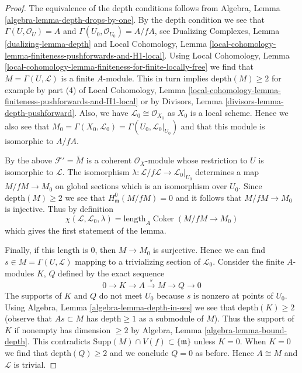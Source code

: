 \documentclass{stacks-project}
\theoremstyle{plain}
\theoremstyle{definition}
\theoremstyle{remark}
\numberwithin{equation}{subsection}
\def\Coker{\mathop{\mathrm{Coker}}}
\begin{document}
\begin{proof}
The equivalence of the depth conditions follows from
Algebra, Lemma \ref{algebra-lemma-depth-drops-by-one}.
By the depth condition we see that
$\Gamma(U, \mathcal{O}_U) = A$ and
$\Gamma(U_0, \mathcal{O}_{U_0}) = A/fA$, see
Dualizing Complexes, Lemma \ref{dualizing-lemma-depth} and
Local Cohomology, Lemma
\ref{local-cohomology-lemma-finiteness-pushforwards-and-H1-local}.
Using Local Cohomology, Lemma
\ref{local-cohomology-lemma-finiteness-for-finite-locally-free}
we find that $M = \Gamma(U, \mathcal{L})$ is a finite $A$-module.
This in turn implies $\text{depth}(M) \geq 2$ for example by
part (4) of Local Cohomology, Lemma
\ref{local-cohomology-lemma-finiteness-pushforwards-and-H1-local}
or by Divisors, Lemma \ref{divisors-lemma-depth-pushforward}.
Also, we have $\mathcal{L}_0 \cong \mathcal{O}_{X_0}$
as $X_0$ is a local scheme. Hence we also see that
$M_0 = \Gamma(X_0, \mathcal{L}_0) = \Gamma(U_0, \mathcal{L}_0|_{U_0})$
and that this module is isomorphic to $A/fA$.

\medskip\noindent
By the above $\mathcal{F}' = \widetilde{M}$ is a coherent
$\mathcal{O}_X$-module whose restriction to $U$ is isomorphic to $\mathcal{L}$.
The isomorphism $\lambda : \mathcal{L}/f\mathcal{L} \to \mathcal{L}_0|_{U_0}$
determines a map $M/fM \to M_0$ on global sections
which is an isomorphism over $U_0$.
Since $\text{depth}(M) \geq 2$ we see
that $H^0_\mathfrak m(M/fM) = 0$ and it follows that
$M/fM \to M_0$ is injective. Thus by definition
$$
\chi(\mathcal{L}, \mathcal{L}_0, \lambda) =
\text{length}_A \Coker(M/fM \to M_0)
$$
which gives the first statement of the lemma.

\medskip\noindent
Finally, if this length is $0$, then $M \to M_0$ is surjective.
Hence we can find $s \in M = \Gamma(U, \mathcal{L})$
mapping to a trivializing section of $\mathcal{L}_0$.
Consider the finite $A$-modules $K$, $Q$ defined by the exact
sequence
$$
0 \to K \to A \xrightarrow{s} M \to Q \to 0
$$
The supports of $K$ and $Q$ do not meet $U_0$ because $s$
is nonzero at points of $U_0$. Using
Algebra, Lemma \ref{algebra-lemma-depth-in-ses}
we see that $\text{depth}(K) \geq 2$ (observe that
$As \subset M$ has $\text{depth} \geq 1$ as a submodule of $M$).
Thus the support of $K$ if nonempty has dimension $\geq 2$ by
Algebra, Lemma \ref{algebra-lemma-bound-depth}.
This contradicts $\text{Supp}(M) \cap V(f) \subset \{\mathfrak m\}$
unless $K = 0$. When $K = 0$ we find that
$\text{depth}(Q) \geq 2$ and we conclude
$Q = 0$ as before. Hence $A \cong M$ and
$\mathcal{L}$ is trivial.
\end{proof}
\end{document}
